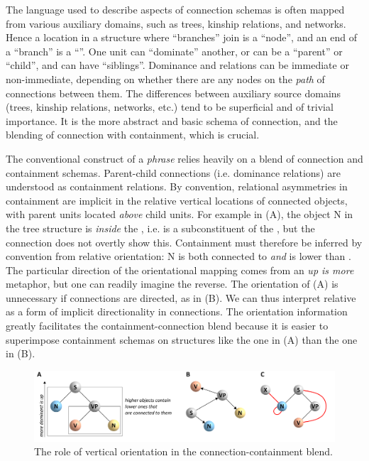   The language used to describe aspects of connection schemas is often mapped from various auxiliary domains, such as trees, kinship relations, and networks. Hence a location in a structure where “branches” join is a “node”, and an end of a “branch” is a “”. One unit can “dominate” another, or can be a “parent” or “child”, and can have “siblings”. Dominance and  relations can be immediate or non-immediate, depending on whether there are any nodes on the \textit{path} of connections between them. The differences between auxiliary source domains (trees, kinship relations, networks, etc.) tend to be superficial and of trivial importance. It is the more abstract and basic schema of connection, and the blending of connection with containment, which is crucial.   

  The conventional construct of a \textit{phrase} relies heavily on a blend of connection and containment schemas. Parent-child connections (i.e. dominance relations) are understood as containment relations. By convention, relational asymmetries in containment are implicit in the relative vertical locations of connected objects, with parent units located \textit{above} child units. For example in {}(A), the object N in the tree structure is \textit{inside} the , i.e. is a subconstituent of the , but the connection does not overtly show this. Containment must therefore be inferred by convention from relative orientation: N is both connected to  \textit{and} is lower than . The particular direction of the orientational mapping comes from an \textit{up is more} metaphor, but one can readily imagine the reverse. The orientation of (A) is unnecessary if connections are directed, as in (B). We can thus interpret relative  as a form of implicit directionality in connections. The orientation information greatly facilitates the containment-connection blend because it is easier to superimpose containment schemas on structures like the one in (A) than the one in (B). 

  
\begin{figure}
\includegraphics[width=\textwidth]{figures/Tilsen-img35.png}
\caption{The role of vertical orientation in the connection-containment blend.}
\label{fig:3:7}
\end{figure}
 

